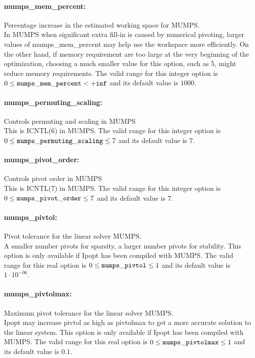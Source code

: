 \paragraph{mumps\_mem\_percent:}\label{sec:mumps_mem_percent} Percentage increase in the estimated working space for MUMPS. $\;$ \\
 In MUMPS when significant extra fill-in is caused
by numerical pivoting, larger values of
mumps\_mem\_percent may help use the workspace
more efficiently.  On the other hand, if memory
requirement are too large at the very beginning
of the optimization, choosing a much smaller
value for this option, such as 5, might reduce
memory requirements. The valid range for this integer option is
$0 \le {\tt mumps\_mem\_percent } <  {\tt +inf}$
and its default value is $1000$.


\paragraph{mumps\_permuting\_scaling:}\label{sec:mumps_permuting_scaling} Controls permuting and scaling in MUMPS $\;$ \\
 This is ICNTL(6) in MUMPS. The valid range for this integer option is
$0 \le {\tt mumps\_permuting\_scaling } \le 7$
and its default value is $7$.


\paragraph{mumps\_pivot\_order:}\label{sec:mumps_pivot_order} Controls pivot order in MUMPS $\;$ \\
 This is ICNTL(7) in MUMPS. The valid range for this integer option is
$0 \le {\tt mumps\_pivot\_order } \le 7$
and its default value is $7$.


\paragraph{mumps\_pivtol:}\label{sec:mumps_pivtol} Pivot tolerance for the linear solver MUMPS. $\;$ \\
 A smaller number pivots for sparsity, a larger
number pivots for stability.  This option is only
available if Ipopt has been compiled with MUMPS. The valid range for this real option is 
$0 \le {\tt mumps\_pivtol } \le 1$
and its default value is $1 \cdot 10^{-06}$.


\paragraph{mumps\_pivtolmax:}\label{sec:mumps_pivtolmax} Maximum pivot tolerance for the linear solver MUMPS. $\;$ \\
 Ipopt may increase pivtol as high as pivtolmax to
get a more accurate solution to the linear
system.  This option is only available if Ipopt
has been compiled with MUMPS. The valid range for this real option is 
$0 \le {\tt mumps\_pivtolmax } \le 1$
and its default value is $0.1$.



